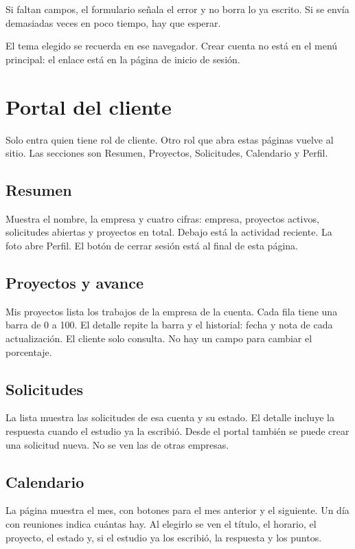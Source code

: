 Si faltan campos, el formulario señala el error y no borra lo ya escrito. Si
se envía demasiadas veces en poco tiempo, hay que esperar.

El tema elegido se recuerda en ese navegador. Crear cuenta no está en el menú
principal: el enlace está en la página de inicio de sesión.

\section{Portal del cliente}

Solo entra quien tiene rol de cliente. Otro rol que abra estas páginas vuelve
al sitio. Las secciones son Resumen, Proyectos, Solicitudes, Calendario y
Perfil.

\subsection{Resumen}

Muestra el nombre, la empresa y cuatro cifras: empresa, proyectos activos,
solicitudes abiertas y proyectos en total. Debajo está la actividad reciente.
La foto abre Perfil. El botón de cerrar sesión está al final de esta página.

\subsection{Proyectos y avance}

Mis proyectos lista los trabajos de la empresa de la cuenta. Cada fila tiene
una barra de 0 a 100. El detalle repite la barra y el historial: fecha y nota
de cada actualización. El cliente solo consulta. No hay un campo para cambiar
el porcentaje.

\subsection{Solicitudes}

La lista muestra las solicitudes de esa cuenta y su estado. El detalle incluye
la respuesta cuando el estudio ya la escribió. Desde el portal también se puede
crear una solicitud nueva. No se ven las de otras empresas.

\subsection{Calendario}

La página muestra el mes, con botones para el mes anterior y el siguiente. Un
día con reuniones indica cuántas hay. Al elegirlo se ven el título, el horario,
el proyecto, el estado y, si el estudio ya los escribió, la respuesta y los
puntos.

